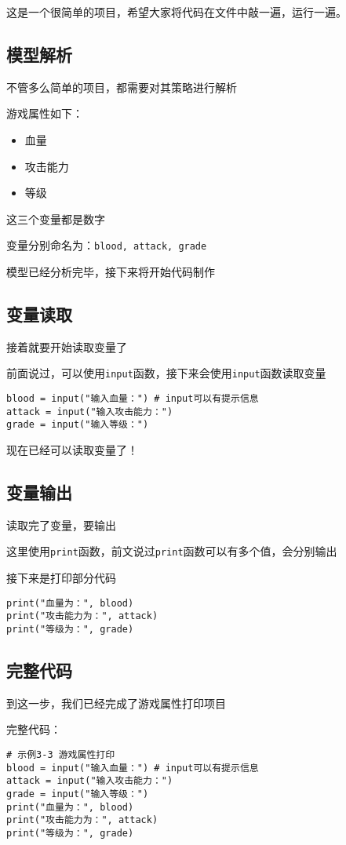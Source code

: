 \documentclass{book}
\begin{document}
这是一个很简单的项目，希望大家将代码在文件中敲一遍，运行一遍。


\subsection{模型解析}
\indent 不管多么简单的项目，都需要对其策略进行解析


游戏属性如下：
\begin{itemize}
    \item 血量
    \item 攻击能力
    \item 等级
\end{itemize}
这三个变量都是数字


变量分别命名为：\verb|blood, attack, grade|


模型已经分析完毕，接下来将开始代码制作
\subsection{变量读取}
\indent 接着就要开始读取变量了


前面说过，可以使用\verb|input|函数，接下来会使用\verb|input|函数读取变量


\begin{verbatim}
blood = input("输入血量：") # input可以有提示信息
attack = input("输入攻击能力：")
grade = input("输入等级：")
\end{verbatim}

现在已经可以读取变量了！


\subsection{变量输出}

\indent 读取完了变量，要输出


这里使用\verb|print|函数，前文说过\verb|print|函数可以有多个值，会分别输出


接下来是打印部分代码
\begin{verbatim}
print("血量为：", blood)
print("攻击能力为：", attack)
print("等级为：", grade)
\end{verbatim}

\subsection{完整代码}
\indent 到这一步，我们已经完成了游戏属性打印项目


完整代码：
\begin{verbatim}
# 示例3-3 游戏属性打印
blood = input("输入血量：") # input可以有提示信息
attack = input("输入攻击能力：")
grade = input("输入等级：")
print("血量为：", blood)
print("攻击能力为：", attack)
print("等级为：", grade)
\end{verbatim}
\end{document}
